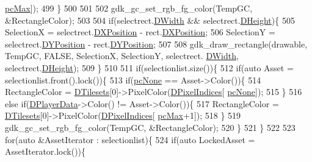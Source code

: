 \begin{DoxyCode}
      \hyperlink{GameDataTypes_8h_aafb0ca75933357ff28a6d7efbdd7602fa594a5c8dd3987f24e8a0f23f1a72cd34}{pcMax}]);
499     \}
500     
501     
502     gdk\_gc\_set\_rgb\_fg\_color(TempGC, &RectangleColor);
503     
504     \textcolor{keywordflow}{if}(selectrect.\hyperlink{structSRectangle_a4150898b3f7d90f6e4b0d44bf1ae3bd2}{DWidth} && selectrect.\hyperlink{structSRectangle_a84ea3c2314c43cab6186170662188899}{DHeight})\{
505         SelectionX = selectrect.\hyperlink{structSRectangle_abcbddb03b3ee416cc33109833b5f075c}{DXPosition} - rect.\hyperlink{structSRectangle_abcbddb03b3ee416cc33109833b5f075c}{DXPosition};
506         SelectionY = selectrect.\hyperlink{structSRectangle_a120aa0a90033bc6e07c36c151a3bbc71}{DYPosition} - rect.\hyperlink{structSRectangle_a120aa0a90033bc6e07c36c151a3bbc71}{DYPosition};
507         
508         gdk\_draw\_rectangle(drawable, TempGC, FALSE, SelectionX, SelectionY, selectrect.
      \hyperlink{structSRectangle_a4150898b3f7d90f6e4b0d44bf1ae3bd2}{DWidth}, selectrect.\hyperlink{structSRectangle_a84ea3c2314c43cab6186170662188899}{DHeight});
509     \}
510     
511     \textcolor{keywordflow}{if}(selectionlist.size())\{
512         \textcolor{keywordflow}{if}(\textcolor{keyword}{auto} Asset = selectionlist.front().lock())\{
513             \textcolor{keywordflow}{if}(\hyperlink{GameDataTypes_8h_aafb0ca75933357ff28a6d7efbdd7602fa88767aa8e02c7b3192bbab4127b3d729}{pcNone} == Asset->Color())\{
514                 RectangleColor = \hyperlink{classCAssetRenderer_ae8201de704851c1de6424a8da77b785e}{DTilesets}[0]->PixelColor(\hyperlink{classCAssetRenderer_aa1d9cd6de6b897ec0b5a244bf822e6bd}{DPixelIndices}[
      \hyperlink{GameDataTypes_8h_aafb0ca75933357ff28a6d7efbdd7602fa88767aa8e02c7b3192bbab4127b3d729}{pcNone}]);
515             \}
516             \textcolor{keywordflow}{else} \textcolor{keywordflow}{if}(\hyperlink{classCAssetRenderer_ae0f36013db2ef04b08b74d92249c1af5}{DPlayerData}->Color() != Asset->Color())\{
517                 RectangleColor = \hyperlink{classCAssetRenderer_ae8201de704851c1de6424a8da77b785e}{DTilesets}[0]->PixelColor(\hyperlink{classCAssetRenderer_aa1d9cd6de6b897ec0b5a244bf822e6bd}{DPixelIndices}[
      \hyperlink{GameDataTypes_8h_aafb0ca75933357ff28a6d7efbdd7602fa594a5c8dd3987f24e8a0f23f1a72cd34}{pcMax}+1]);
518             \}
519             gdk\_gc\_set\_rgb\_fg\_color(TempGC, &RectangleColor);
520         \}
521     \}
522     
523     \textcolor{keywordflow}{for}(\textcolor{keyword}{auto} &AssetIterator : selectionlist)\{
524         \textcolor{keywordflow}{if}(\textcolor{keyword}{auto} LockedAsset = AssetIterator.lock())\{

\end{DoxyCode}
